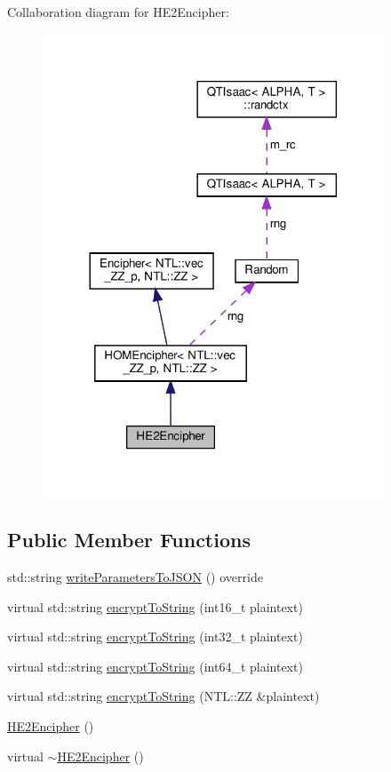 Collaboration diagram for H\+E2\+Encipher\+:
\nopagebreak
\begin{figure}[H]
\begin{center}
\leavevmode
\includegraphics[width=288pt]{classHE2Encipher__coll__graph}
\end{center}
\end{figure}
\subsection*{Public Member Functions}
\begin{DoxyCompactItemize}
\item 
std\+::string \hyperlink{classHE2Encipher_a802a75d83bb833bf458a1e89792026bc}{write\+Parameters\+To\+J\+S\+ON} () override
\item 
virtual std\+::string \hyperlink{classHE2Encipher_a3546d0dfa3e656ec6fcde1c0a4678460}{encrypt\+To\+String} (int16\+\_\+t plaintext)
\item 
virtual std\+::string \hyperlink{classHE2Encipher_a10d552ea918c1c0a67f226745fed3ef6}{encrypt\+To\+String} (int32\+\_\+t plaintext)
\item 
virtual std\+::string \hyperlink{classHE2Encipher_a3c4dfca45e9f65955e64a328910b1339}{encrypt\+To\+String} (int64\+\_\+t plaintext)
\item 
virtual std\+::string \hyperlink{classHE2Encipher_a2b0d3c50f377d3cabe1a102f55ae2b48}{encrypt\+To\+String} (N\+T\+L\+::\+ZZ \&plaintext)
\item 
\hyperlink{classHE2Encipher_ab639560a28321b94af1ae72b7d375f58}{H\+E2\+Encipher} ()
\item 
virtual \hyperlink{classHE2Encipher_aa62b5f97090f8b14eeeff436664ef8e6}{$\sim$\+H\+E2\+Encipher} ()
\end{DoxyCompactItemize}
